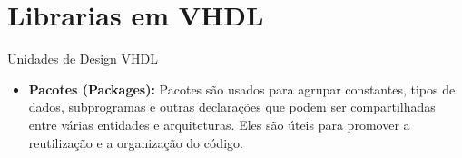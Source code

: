 \documentclass[aspectratio=169]{beamer}
\begin{document}




\section{Librarias em VHDL}



\begin{frame}{Unidades de Design VHDL}
	\justifying
	
	\begin{itemize}
		\justifying
		
		
		\item \textbf{Pacotes (Packages):} Pacotes são usados para agrupar constantes, tipos de dados, subprogramas e outras declarações que podem ser compartilhadas entre várias entidades e arquiteturas. Eles são úteis para promover a reutilização e a organização do código.
		
		
		
	\end{itemize}
	
	
\end{frame}
\end{document}
